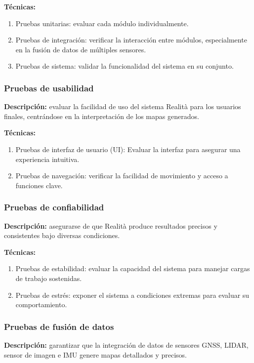 \documentclass[12pt,a4paper, twoside]{article} %
\begin{document}
\textbf{Técnicas:}
\begin{enumerate}
    \item Pruebas unitarias: evaluar cada módulo individualmente.
    \item Pruebas de integración: verificar la interacción entre módulos, especialmente en la fusión de datos de múltiples sensores.
    \item Pruebas de sistema: validar la funcionalidad del sistema en su conjunto.
\end{enumerate}

\subsubsection{Pruebas de usabilidad}

\textbf{Descripción:} evaluar la facilidad de uso del sistema Realità para los usuarios finales, centrándose en la interpretación de los mapas generados.

\textbf{Técnicas:}
\begin{enumerate}
    \item Pruebas de interfaz de usuario (UI): Evaluar la interfaz para asegurar una experiencia intuitiva.
    \item Pruebas de navegación: verificar la facilidad de movimiento y acceso a funciones clave.
\end{enumerate}

\subsubsection{Pruebas de confiabilidad}

\textbf{Descripción:} asegurarse de que Realità produce resultados precisos y consistentes bajo diversas condiciones.

\textbf{Técnicas:}
\begin{enumerate}
    \item Pruebas de estabilidad: evaluar la capacidad del sistema para manejar cargas de trabajo sostenidas.
    \item Pruebas de estrés: exponer el sistema a condiciones extremas para evaluar su comportamiento.
\end{enumerate}

\subsubsection{Pruebas de fusión de datos}

\textbf{Descripción:} garantizar que la integración de datos de sensores GNSS, LIDAR, sensor de imagen e IMU genere mapas detallados y precisos.
\end{document}
